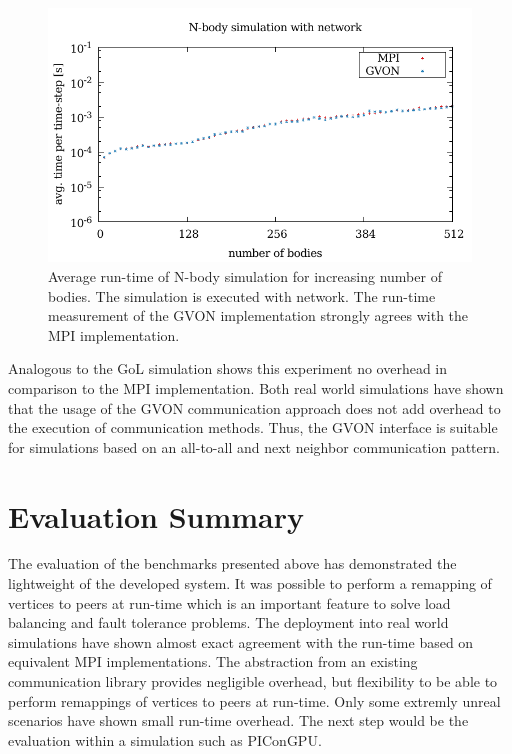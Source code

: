 \begin{figure}[H]
  \includegraphics[width=\textwidth]{plots/50_nbody_network_laser}
  \caption{Average run-time of N-body simulation for increasing number
    of bodies. The simulation is executed with network. The run-time
    measurement of the GVON implementation strongly agrees with the
    MPI implementation.}
  \label{fig:nbody_laser}
\end{figure}

\noindent Analogous to the GoL simulation shows this experiment no
overhead in comparison to the MPI implementation.  Both real world
simulations have shown that the usage of the GVON communication
approach does not add overhead to the execution of communication
methods. Thus, the GVON interface is suitable for simulations based on
an all-to-all and next neighbor communication pattern.





\section*{Evaluation Summary}

The evaluation of the benchmarks presented above has demonstrated the
lightweight of the developed system. It was possible to perform
a remapping of vertices to peers at run-time which is an important feature to
solve load balancing and fault tolerance problems. The deployment into
real world simulations have shown almost exact agreement with the
run-time based on equivalent MPI implementations.  The abstraction
from an existing communication library provides negligible overhead,
but flexibility to be able to perform remappings of vertices to peers
at run-time. Only some extremly unreal scenarios have shown small
run-time overhead. The next step would be the evaluation within a
simulation such as PIConGPU.


\cleardoublepage

